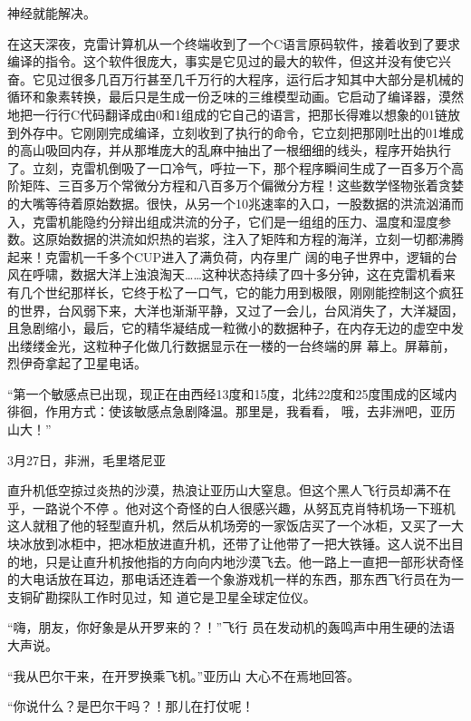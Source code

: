 \documentclass{article}
\begin{document}
\newpage
神经就能解决。 

在这天深夜，克雷计算机从一个终端收到了一个C语言原码软件，接着收到了要求编译的指令。这个软件很庞大，事实是它见过的最大的软件，但这并没有使它兴奋。它见过很多几百万行甚至几千万行的大程序，运行后才知其中大部分是机械的循环和象素转换，最后只是生成一份乏味的三维模型动画。它启动了编译器，漠然地把一行行C代码翻译成由0和1组成的它自己的语言，把那长得难以想象的01链放到外存中。它刚刚完成编译，立刻收到了执行的命令，它立刻把那刚吐出的01堆成的高山吸回内存，并从那堆庞大的乱麻中抽出了一根细细的线头，程序开始执行了。立刻，克雷机倒吸了一口冷气，呼拉一下，那个程序瞬间生成了一百多万个高阶矩阵、三百多万个常微分方程和八百多万个偏微分方程！这些数学怪物张着贪婪的大嘴等待着原始数据。很快，从另一个10兆速率的入口，一股数据的洪流汹涌而入，克雷机能隐约分辩出组成洪流的分子，它们是一组组的压力、温度和湿度参数。这原始数据的洪流如炽热的岩浆，注入了矩阵和方程的海洋，立刻一切都沸腾起来！克雷机一千多个CUP进入了满负荷，内存里广
\newpage
阔的电子世界中，逻辑的台风在呼啸，数据大洋上浊浪淘天……这种状态持续了四十多分钟，这在克雷机看来有几个世纪那样长，它终于松了一口气，它的能力用到极限，刚刚能控制这个疯狂的世界，台风弱下来，大洋也渐渐平静，又过了一会儿，台风消失了，大洋凝固，且急剧缩小，最后，它的精华凝结成一粒微小的数据种子，在内存无边的虚空中发出缕缕金光，这粒种子化做几行数据显示在一楼的一台终端的屏
幕上。屏幕前，烈伊奇拿起了卫星电话。 

“第一个敏感点已出现，现正在由西经13度和15度，北纬22度和25度围成的区域内徘徊，作用方式：使该敏感点急剧降温。那里是，我看看，
哦，去非洲吧，亚历山大！” 


 


3月27日，非洲，毛里塔尼亚 

直升机低空掠过炎热的沙漠，热浪让亚历山大窒息。但这个黑人飞行员却满不在乎，一路说个不停
\newpage
。他对这个奇怪的白人很感兴趣，从努瓦克肖特机场一下班机这人就租了他的轻型直升机，然后从机场旁的一家饭店买了一个冰柜，又买了一大块冰放到冰柜中，把冰柜放进直升机，还带了让他带了一把大铁锤。这人说不出目的地，只是让直升机按他指的方向向内地沙漠飞去。他一路上一直把一部形状奇怪的大电话放在耳边，那电话还连着一个象游戏机一样的东西，那东西飞行员在为一支铜矿勘探队工作时见过，知
道它是卫星全球定位仪。 

“嗨，朋友，你好象是从开罗来的？！”飞行
员在发动机的轰鸣声中用生硬的法语大声说。 

“我从巴尔干来，在开罗换乘飞机。”亚历山
大心不在焉地回答。 

“你说什么？是巴尔干吗？！那儿在打仗呢！
\end{document}
